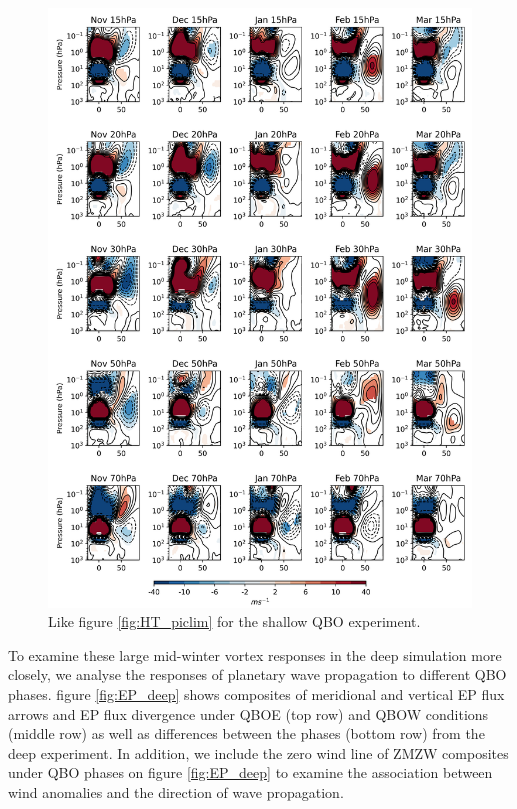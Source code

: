 \begin{figure}[h!]
\begin{center}
\noindent\includegraphics[width = 0.9\linewidth]{Figures/Figures-deepQBO/ZMZW_composites_by_month_QBO_phases_U_s_MarQBO_vs_Mar_70hPa_5thresh.png}
\caption[ZMZW composites under different QBO phases in the shallow QBO simulation]{Like figure \ref{fig:HT_piclim} for the shallow QBO experiment.}
\label{fig:HT_shallow}
\end{center}
\end{figure}
\newpage 

To examine these large mid-winter vortex responses in the deep simulation more closely, we analyse the responses of planetary wave propagation to different QBO phases. figure \ref{fig:EP_deep} shows composites of meridional and vertical EP flux arrows and EP flux divergence under QBOE (top row) and QBOW conditions (middle row) as well as differences between the phases (bottom row) from the deep experiment. In addition, we include the zero wind line of ZMZW composites under QBO phases on figure \ref{fig:EP_deep} to examine the association between wind anomalies and the direction of wave propagation. 

